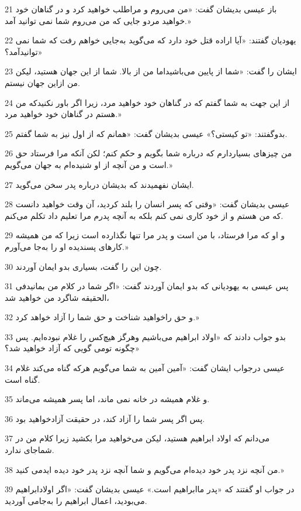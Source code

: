 \par 21 باز عیسی بدیشان گفت: «من می‌روم و مراطلب خواهید کرد و در گناهان خود خواهید مردو جایی که من می‌روم شما نمی توانید آمد.»
\par 22 یهودیان گفتند: «آیا اراده قتل خود دارد که می‌گوید به‌جایی خواهم رفت که شما نمی توانیدآمد؟»
\par 23 ایشان را گفت: «شما از پایین می‌باشیداما من از بالا. شما از این جهان هستید، لیکن من ازاین جهان نیستم.
\par 24 از این جهت به شما گفتم که در گناهان خود خواهید مرد، زیرا اگر باور نکنیدکه من هستم در گناهان خود خواهید مرد.»
\par 25 بدوگفتند: «تو کیستی؟» عیسی بدیشان گفت: «همانم که از اول نیز به شما گفتم.
\par 26 من چیزهای بسیاردارم که درباره شما بگویم و حکم کنم؛ لکن آنکه مرا فرستاد حق است و من آنچه از او شنیده‌ام به جهان می‌گویم.»
\par 27 ایشان نفهمیدند که بدیشان درباره پدر سخن می‌گوید.
\par 28 عیسی بدیشان گفت: «وقتی که پسر انسان را بلند کردید، آن وقت خواهید دانست که من هستم و از خود کاری نمی کنم بلکه به آنچه پدرم مرا تعلیم داد تکلم می‌کنم.
\par 29 و او که مرا فرستاد، با من است و پدر مرا تنها نگذارده است زیرا که من همیشه کارهای پسندیده او را به‌جا می‌آورم.»
\par 30 چون این را گفت، بسیاری بدو ایمان آوردند.
\par 31 پس عیسی به یهودیانی که بدو ایمان آوردند گفت: «اگر شما در کلام من بمانیدفی الحقیقه شاگرد من خواهید شد،
\par 32 و حق راخواهید شناخت و حق شما را آزاد خواهد کرد.»
\par 33 بدو جواب دادند که «اولاد ابراهیم می‌باشیم وهرگز هیچ‌کس را غلام نبوده‌ایم. پس چگونه تومی گویی که آزاد خواهید شد؟»
\par 34 عیسی درجواب ایشان گفت: «آمین آمین به شما می‌گویم هر‌که گناه می‌کند غلام گناه است.
\par 35 و غلام همیشه در خانه نمی ماند، اما پسر همیشه می‌ماند.
\par 36 پس اگر پسر شما را آزاد کند، در حقیقت آزادخواهید بود.
\par 37 می‌دانم که اولاد ابراهیم هستید، لیکن می‌خواهید مرا بکشید زیرا کلام من در شماجای ندارد.
\par 38 من آنچه نزد پدر خود دیده‌ام می‌گویم و شما آنچه نزد پدر خود دیده ایدمی کنید.»
\par 39 در جواب او گفتند که «پدر ماابراهیم است.» عیسی بدیشان گفت: «اگر اولادابراهیم می‌بودید، اعمال ابراهیم را به‌جامی آوردید.
